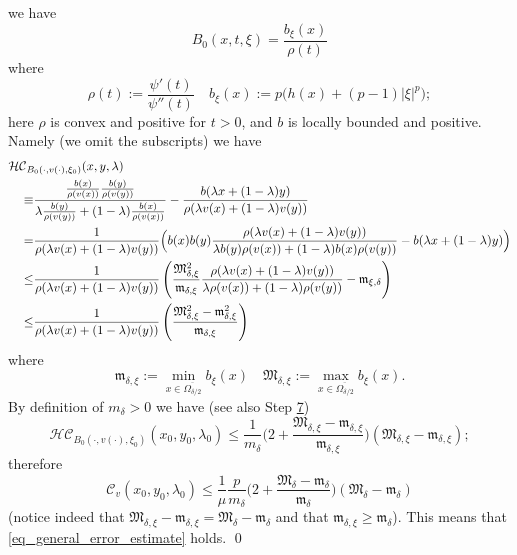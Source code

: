 \documentclass[11pt, reqno]{amsart}
\theoremstyle{definition}
\numberwithin{equation}{section}
\newcommand{\mc}[1]{\mathcal{#1}}
\renewenvironment{proof}[1][\proofname]{\medskip \noindent {\bfseries #1. }}{\qed \bigskip}
\begin{document}
\begin{proof}
we have
$$B_0(x,t,\xi)= \frac{ b_{\xi}(x)}{\rho(t)} $$
where
 $$\rho(t):= \frac{\psi'(t)}{\psi''(t)} \quad b_{\xi}(x) := p \big( h(x) + (p-1) |\xi|^p \big);$$
here $\rho$ is convex and positive for $t>0$, and $b$ is locally bounded and positive.
Namely (we omit the subscripts) we have 
 \begin{align*}
\MoveEqLeft 
\mc{HC}_{B_0(\cdot, v(\cdot), \xi_0)}(x,y,\lambda) \\
\equiv & 
\frac{\frac{b(x)}{\rho(v(x)) }\frac{b(y)}{\rho(v(y))}}{\lambda \frac{b(y)}{ \rho(v(y))} + (1-\lambda)\frac{b(x)}{ \rho(v(x))}} - \frac{b(\lambda x + (1-\lambda)y)}{ \rho(\lambda v(x) + (1-\lambda) v(y))} \\
=& \frac{1}{ \rho(\lambda v(x) + (1-\lambda) v(y))} \Big( b(x) b(y) \frac{ \rho(\lambda v(x) + (1-\lambda) v(y))}{ \lambda b(y) \rho(v(x)) + (1-\lambda) b(x) \rho(v(y))} - b(\lambda x + (1-\lambda)y)\Big) \\
\leq & \frac{1}{ \rho(\lambda v(x) + (1-\lambda) v(y))} \left( \frac{\mathfrak{M}_{\delta,\xi}^2}{\mathfrak{m}_{\delta,\xi}} \frac{ \rho(\lambda v(x) + (1-\lambda) v(y))}{ \lambda \rho(v(x)) + (1-\lambda) \rho(v(y))} - \mathfrak{m}_{\xi,\delta} \right) \\
\leq & \frac{1}{ \rho(\lambda v(x) + (1-\lambda) v(y))} \left( \frac{\mathfrak{M}_{\delta,\xi}^2-\mathfrak{m}_{\delta,\xi}^2}{\mathfrak{m}_{\delta,\xi}}\right)
\end{align*}
where 
$$\mathfrak{m}_{\delta,\xi}:= \min_{x \in \overline{\Omega_{\delta/2}}} b_{\xi}(x) \quad \mathfrak{M}_{\delta,\xi} := \max_{x \in \overline{\Omega_{\delta/2}}} b_{\xi}(x) .$$
By definition of $m_{\delta}>0$ we have (see also Step \hyperlink{Step7}{\rm{7}}) 
$$\mc{HC}_{B_0(\cdot, v(\cdot), \xi_0)}(x_0, y_0, \lambda_0) \leq \frac{1}{m_{\delta}} \bigg( 2 + \frac{\mathfrak{M}_{\delta,\xi} - \mathfrak{m}_{\delta,\xi}}{\mathfrak{m}_{\delta,\xi}}\bigg) (\mathfrak{M}_{\delta,\xi}-\mathfrak{m}_{\delta,\xi});$$
therefore
$$\mc{C}_{v}(x_0, y_0, \lambda_0) \leq \frac{1}{\mu} \frac{p}{m_{\delta}} \bigg( 2 + \frac{\mathfrak{M}_{\delta} - \mathfrak{m}_{\delta}}{\mathfrak{m}_{\delta}}\bigg) (\mathfrak{M}_{\delta}-\mathfrak{m}_{\delta})$$
(notice indeed that $\mathfrak{M}_{\delta,\xi} - \mathfrak{m}_{\delta,\xi} = \mathfrak{M}_{\delta} - \mathfrak{m}_{\delta}$ and that $\mathfrak{m}_{\delta, \xi} \geq \mathfrak{m}_{\delta}$).
This means that \eqref{eq_general_error_estimate} holds.
\end{proof}
\end{document}
